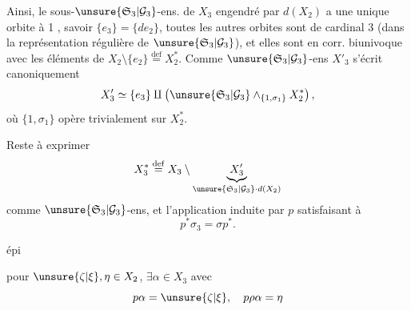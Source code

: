 
Ainsi, le sous-$\unsure{\mathfrak S_3|\mathcal G_3}$-ens.  de $X_3$ engendré par $d(X_2)$ a une unique orbite à 1 , savoir $\{e_3\}=\{de_2\}$, toutes les autres orbites sont de cardinal 3  (dans la représentation régulière de $\unsure{\mathfrak S_3|\mathcal G_3}$), et elles sont en corr. biunivoque avec les éléments de $X_2\setminus\{e_2\}\overset{\mathrm{def}}=X_2^*$. Comme $\unsure{\mathfrak S_3|\mathcal G_3}$-ens $X'_3$ s'écrit canoniquement
\[
X'_3\simeq\{e_3\}\amalg\left(\unsure{\mathfrak S_3|\mathcal G_3}\wedge_{\{1,\sigma_1\}}X_2^*\right),
\]
où $\{1,\sigma_1\}$ opère trivialement sur $X_2^*$.


Reste à exprimer
\[
X_3^*\overset{\mathrm{def}}=X_3\setminus\underbrace{X'_3}_{\unsure{\mathfrak S_3|\mathcal G_3}\cdot d(X_2)}
\]
comme $\unsure{\mathfrak S_3|\mathcal G_3}$-ens, et l'application induite par $p$
satisfaisant à
\[
\boxed{p^*\sigma_3=\sigma p^*}.
\]

épi


pour $\unsure{\zeta|\xi},\eta\in X_2$, $\exists\alpha\in X_3$ avec
\[
p\alpha=\unsure{\zeta|\xi},\quad p\rho\alpha=\eta
\]

